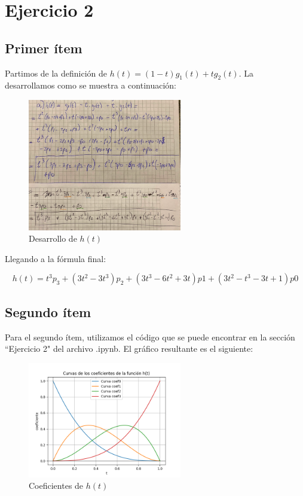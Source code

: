 \documentclass{article}
\begin{document}
\section*{Ejercicio 2}
\subsection*{Primer ítem}
Partimos de la definición de $h(t) = (1 - t)g_1(t) + t g_2(t)$. La desarrollamos como se muestra a continuación:

\begin{figure}[H]
    \centering
    \includegraphics[width=0.6\textwidth]{imagenes/2a.png}
    \caption{Desarrollo de $h(t)$}
    \label{fig:ejemplo}
\end{figure}

Llegando a la fórmula final:

$$
h(t) = t^3p_3 + (3t^2-3t^3)p_2 + (3t^3-6t^2+3t)p1 + (3t^2-t^3-3t+1)p0
$$

\subsection*{Segundo ítem}
Para el segundo ítem, utilizamos el código que se puede encontrar en la sección ``Ejercicio 2" del archivo .ipynb. El gráfico resultante es el siguiente:

\begin{figure}[H]
    \centering
    \includegraphics[width=0.6\textwidth]{imagenes/graf_2a.png}
    \caption{Coeficientes de $h(t)$}
    \label{fig:ejemplo}
\end{figure}
\end{document}
